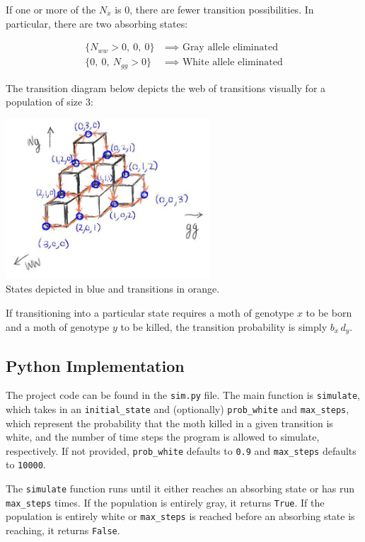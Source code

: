 \documentclass[leqno]{article}
\begin{document}
If one or more of the $N_x$ is $0$, there are fewer transition possibilities. In particular, there are two absorbing states:

\begin{align*}
\{N_{ww} > 0,\ 0,\ 0\} &\ \implies \text{ Gray allele eliminated}\\
\{0,\ 0,\ N_{gg} > 0\} &\ \implies \text{ White allele eliminated}
\end{align*} 

The transition diagram below depicts the web of transitions visually for a population of size $3$:

\begin{center}
\includegraphics[width=3in]{transition_diagram.jpg}{\\States depicted in blue and transitions in orange.}
\end{center}

If transitioning into a particular state requires a moth of genotype $x$ to be born and a moth of genotype $y$ to be killed, the transition probability is simply $b_{x}\, d_{y}$.

\subsection{Python Implementation}

The project code can be found in the {\tt sim.py} file. The main function is {\tt simulate}, which takes in an {\tt initial\_state} and (optionally) {\tt prob\_white} and {\tt max\_steps}, which represent the probability that the moth killed in a given transition is white, and the number of time steps the program is allowed to simulate, respectively. If not provided, {\tt prob\_white} defaults to {\tt 0.9} and {\tt max\_steps} defaults to {\tt 10000}.

The {\tt simulate} function runs until it either reaches an absorbing state or has run {\tt max\_steps} times. If the population is entirely gray, it returns {\tt True}. If the population is entirely white or {\tt max\_steps} is reached before an absorbing state is reaching, it returns {\tt False}.
\end{document}
